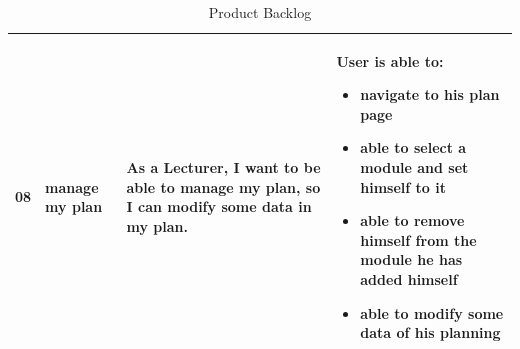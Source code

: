 \documentclass{scrartcl}
\begin{document}
\begin{table}[H]
\begin{center}
\begin{tabular}{|p{0.5cm} |p{3cm}|p{5.5cm}|p{5.5cm}|}

08&
manage my plan&

As a Lecturer, I want to be able to manage my plan, so I can modify some data in my plan. &

 User is able to:            
\begin{itemize}

\item navigate to his plan page
\item able to select a module and set himself to it 
\item able to remove himself from the module he has added himself
\item able to modify some data of his planning 
\end{itemize}                                                                 \\ \hline







  \end{tabular}
\end{center}
\caption{Product Backlog}
\label{table2}
\end{table}

\pagebreak
\end{document}
